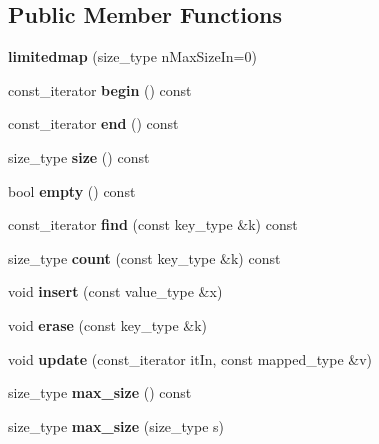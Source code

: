 \subsection*{Public Member Functions}
\begin{DoxyCompactItemize}
\item 
\mbox{\label{classlimitedmap_a6670d7a262af3551de75658123b7cb60}} 
{\bfseries limitedmap} (size\+\_\+type n\+Max\+Size\+In=0)
\item 
\mbox{\label{classlimitedmap_a00fae18eb84547065de8beeaa3ca8fe1}} 
const\+\_\+iterator {\bfseries begin} () const
\item 
\mbox{\label{classlimitedmap_a5d4fe21081932bc9bd8268c849a00540}} 
const\+\_\+iterator {\bfseries end} () const
\item 
\mbox{\label{classlimitedmap_a11cfe0c541b69e34ec6b98239d3c9971}} 
size\+\_\+type {\bfseries size} () const
\item 
\mbox{\label{classlimitedmap_ac93bddc5df19889386fb4094ad117ca6}} 
bool {\bfseries empty} () const
\item 
\mbox{\label{classlimitedmap_acc9d08f77369c57ef2ce22788b146a8e}} 
const\+\_\+iterator {\bfseries find} (const key\+\_\+type \&k) const
\item 
\mbox{\label{classlimitedmap_adc3168f5a48a8b5e13a1c45decb70834}} 
size\+\_\+type {\bfseries count} (const key\+\_\+type \&k) const
\item 
\mbox{\label{classlimitedmap_af68570a54d74e1b168908be6e8cfb85c}} 
void {\bfseries insert} (const value\+\_\+type \&x)
\item 
\mbox{\label{classlimitedmap_aaf2fa41d8f7591d93e5010cf8c351de6}} 
void {\bfseries erase} (const key\+\_\+type \&k)
\item 
\mbox{\label{classlimitedmap_af29154e7161f1deeea268d0dcea464ab}} 
void {\bfseries update} (const\+\_\+iterator it\+In, const mapped\+\_\+type \&v)
\item 
\mbox{\label{classlimitedmap_a3b977a4a010f6c4513ee064835ecbf36}} 
size\+\_\+type {\bfseries max\+\_\+size} () const
\item 
\mbox{\label{classlimitedmap_a97e3deba25cf9a59658cfc317507d45d}} 
size\+\_\+type {\bfseries max\+\_\+size} (size\+\_\+type s)
\end{DoxyCompactItemize}
